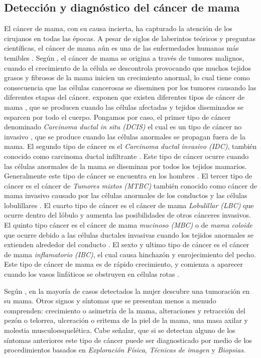 \subsection{Detección y diagnóstico del cáncer de mama}
El cáncer de mama, con su causa incierta, ha capturado la atención de los cirujanos en todas las épocas. A pesar de siglos de laberintos teóricos y preguntas científicas, el cáncer de mama aún es una de las enfermedades humanas más temibles \cite{Bland2009}. Según \cite{Fatima2020}, el cáncer de mama se origina a través de tumores malignos, cuando el crecimiento de la célula se descontrola provocando que muchos tejidos grasos y fibrosos de la mama inicien un crecimiento anormal, lo cual tiene como consecuencia que las células cancerosas se diseminen por los tumores causando las diferentes etapas del cáncer. \cite{Fatima2020} exponen que existen diferentes tipos de cáncer de mama \cite{Sun2017}, que se producen cuando las células afectadas y tejidos diseminados se esparcen por todo el cuerpo. Pongamos por caso, el primer tipo de cáncer denominado \textit{Carcinoma ductal in situ (DCIS)} el cual es un tipo de cáncer no invasivo \cite{Hou2020}, que se produce cuando las células anormales se propagan fuera de la mama. El segundo tipo de cáncer es el \textit{Carcinoma ductal invasivo (IDC)}, también conocido como carcinoma ductal infiltrante \cite{Chaudhury2011}. Este tipo de cáncer ocurre cuando las células anormales de la mama se diseminan por todos los tejidos mamarios. Generalmente este tipo de cáncer se encuentra en los hombres \cite{Page1982}. El tercer tipo de cáncer es el cáncer de \textit{Tumores mixtos (MTBC)} también conocido como cáncer de mama invasivo \cite{Tuck1997} causado por las células anormales de los conductos y las células lobulillares \cite{Lee2017}. El cuarto tipo de cáncer es el cáncer de mama \textit{Lobulillar (LBC)} \cite{Masciari2007} que ocurre dentro del lóbulo y aumenta las posibilidades de otros cánceres invasivos. El quinto tipo cáncer es el cáncer de mama \textit{mucinoso (MBC)} o de \textit{mama coloide} \cite{Memis2000} que ocurre debido a las células ductales invasivas cuando los tejidos anormales se extienden alrededor del conducto \cite{Gradilone2011}. El sexto y ultimo tipo de cáncer es el cáncer de mama \textit{inflamatorio (IBC)}, el cual causa hinchazón y enrojecimiento del pecho. Este tipo de cáncer de mama es de rápido crecimiento, y comienza a aparecer cuando los vasos linfáticos se obstruyen en células rotas \cite{Robertson2010}.

Según \cite{Brunicardi2010}, en la mayoría de casos detectados la mujer descubre una tumoración en su mama. Otros signos y síntomas que se presentan menos a menudo comprenden: crecimiento o asimetría de la mama, alteraciones y retracción del pezón o telorrea, ulceración o eritema de la piel de la mama, una masa axilar y molestia musculoesquelética. Cabe señalar, que si se detectan alguno de los síntomas anteriores este tipo de cáncer puede ser diagnosticado por medio de los procedimientos basados en \textit{Exploración Física}, \textit{Técnicas de imagen} y \textit{Biopsias}. 


